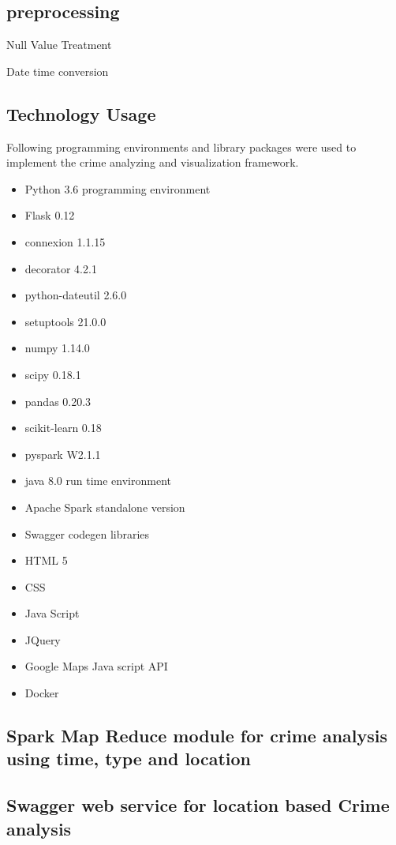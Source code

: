 \subsection{preprocessing}

Null Value Treatment

Date time conversion

\subsection{Technology Usage}
Following programming environments and library packages were  used to implement the crime analyzing and visualization framework. 
\begin{itemize}
	\item Python 3.6 programming environment
	\item Flask 0.12
	\item connexion 1.1.15
	\item decorator 4.2.1
	\item python-dateutil 2.6.0
	\item setuptools 21.0.0
	\item numpy 1.14.0
	\item scipy 0.18.1
	\item pandas 0.20.3
	\item scikit-learn 0.18
	\item pyspark W2.1.1
	\item java 8.0 run time environment
	\item Apache Spark standalone version
	\item Swagger codegen libraries
	\item HTML 5
	\item CSS
	\item Java Script
	\item JQuery
	\item Google Maps Java script API
	\item Docker
\end{itemize}

\subsection{Spark Map Reduce module for crime analysis using time, type and location}

\subsection{Swagger web service for location based Crime analysis}

